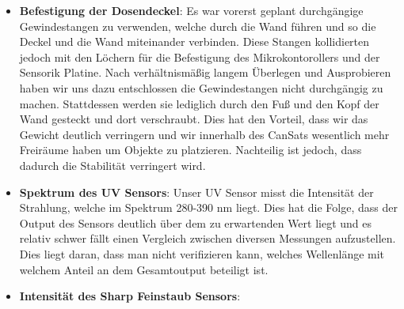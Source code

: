 \begin{itemize}
	\item \textbf{Befestigung der Dosendeckel}: Es war vorerst geplant durchgängige Gewindestangen zu verwenden, welche durch die Wand führen und so die Deckel und die Wand miteinander verbinden. Diese Stangen kollidierten jedoch mit den Löchern für die Befestigung des Mikrokontorollers und der Sensorik Platine. Nach verhältnismäßig langem Überlegen und Ausprobieren haben wir uns dazu entschlossen die Gewindestangen nicht durchgängig zu machen. Stattdessen werden sie lediglich durch den Fuß und den Kopf der Wand gesteckt und dort verschraubt. Dies hat den Vorteil, dass wir das Gewicht deutlich verringern und wir innerhalb des CanSats wesentlich mehr Freiräume haben um Objekte zu platzieren. Nachteilig ist jedoch, dass dadurch die Stabilität verringert wird.
	\item \textbf{Spektrum des UV Sensors}: Unser UV Sensor misst die Intensität der Strahlung, welche im Spektrum 280-390 nm liegt. Dies hat die Folge, dass der Output des Sensors deutlich über dem zu erwartenden Wert liegt und es relativ schwer fällt einen Vergleich zwischen diversen Messungen aufzustellen. Dies liegt daran, dass man nicht verifizieren kann, welches Wellenlänge mit welchem Anteil an dem Gesamtoutput beteiligt ist.
	\item \textbf{Intensität des Sharp Feinstaub Sensors}: 
\end{itemize}



